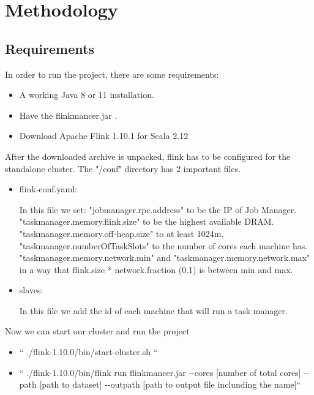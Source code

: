 \chapter{Methodology}



\section{Requirements}


In order to run the project, there are some requirements:
\begin{itemize}
\item A working Java 8 or 11 installation.
\item Have the flinkmancer.jar .  
\item Download Apache Flink 1.10.1 for Scala 2.12
\end{itemize}
After the downloaded archive is unpacked, flink has to be configured for the standalone cluster. The "/conf" directory has 2 important files.
\begin{itemize}
\item flink-conf.yaml:

In this file we set: 
\newline "jobmanager.rpc.address"  to be the IP of Job Manager. 
\newline "taskmanager.memory.flink.size" to be the highest available DRAM. 
\newline "taskmanager.memory.off-heap.size" to at least 1024m. 
\newline "taskmanager.numberOfTaskSlots" to the number of cores each machine has. 
\newline "taskmanager.memory.network.min" and "taskmanager.memory.network.max" 
\newline in a way that flink.size * network.fraction (0.1) is between min and max.

\item slaves:

In this file we add the id of each machine that will run a task manager. 
\end{itemize}
Now we can start our cluster and run the project
\begin{itemize}
\item  “ ./flink-1.10.0/bin/start-cluster.sh “ 
\item  “ ./flink-1.10.0/bin/flink run flinkmancer.jar -{}-cores [number of total cores] -{}-path [path to dataset] -{}-outpath [path to output file inclunding the name]“ 
\end{itemize}

